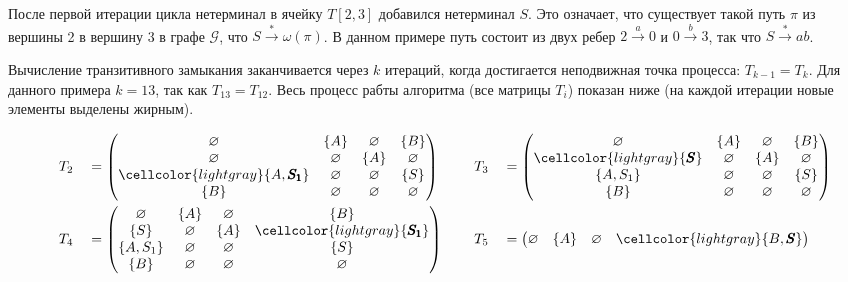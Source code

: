\begin{example}
После первой итерации цикла нетерминал в ячейку $T[2,3]$ добавился нетерминал $S$.
Это означает, что существует такой путь $\pi$ из вершины 2 в вершину 3 в графе $\mathcal{G}$, что $S \xrightarrow{*} \omega(\pi)$. В данном примере путь состоит из двух ребер $2 \xrightarrow{a} 0$ и $ 0 \xrightarrow{b} 3$, так что $S \xrightarrow{*} ab$.

Вычисление транзитивного замыкания заканчивается через $k$ итераций, когда достигается неподвижная точка процесса: $T_{k-1} = T_k$. Для данного примера $k = 13$, так как $T_{13} = T_{12}$. Весь процесс рабты алгоритма (все матрицы $T_i$) показан ниже (на каждой итерации новые элементы выделены жирным).

{\footnotesize
\begin{alignat*}{7}
& &&T_2 &&= \begin{pmatrix}
\varnothing & \{A\}       & \varnothing & \{B\}       \\
\varnothing & \varnothing & \{A\}       & \varnothing \\
\cellcolor{lightgray} \{A, \pmb{S_1}\}  & \varnothing & \varnothing & \{S\}       \\
\{B\}       & \varnothing & \varnothing & \varnothing \\
\end{pmatrix} \ \ \ \ &&T_3 &&= \begin{pmatrix}
\varnothing & \{A\}       & \varnothing & \{B\}       \\
\cellcolor{lightgray} \{\pmb{S}\}       & \varnothing & \{A\}       & \varnothing \\
\{A, S_1\}  & \varnothing & \varnothing & \{S\}       \\
\{B\}       & \varnothing & \varnothing & \varnothing \\
\end{pmatrix} \\ & &&T_4 &&= \begin{pmatrix}
\varnothing & \{A\}       & \varnothing & \{B\}       \\
\{S\}       & \varnothing & \{A\}       & \cellcolor{lightgray} \{\pmb{S_1}\}     \\
\{A, S_1\}  & \varnothing & \varnothing & \{S\}       \\
\{B\}       & \varnothing & \varnothing & \varnothing \\
\end{pmatrix}  \ \ \ \ &&T_5 &&= \begin{pmatrix}
\varnothing & \{A\}       & \varnothing & \cellcolor{lightgray} \{B, \pmb{S}\}    \\

\end{pmatrix}
\end{alignat*}}
\end{example}
